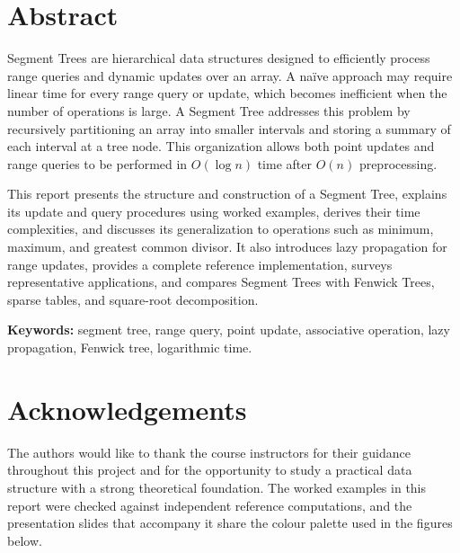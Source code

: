 \documentclass[
  11pt,
  a4paper,
  twoside=false,
  numbers=noenddot,
  headings=big,
  parskip=half,
  toc=bibliography,
  toc=listof,
  bibliography=totoc
]{scrreprt}
\newcounter{example}[chapter]
\begin{document}
\chapter*{Abstract}

Segment Trees are hierarchical data structures designed to efficiently process range queries and dynamic updates over an array. A na\"ive approach may require linear time for every range query or update, which becomes inefficient when the number of operations is large. A Segment Tree addresses this problem by recursively partitioning an array into smaller intervals and storing a summary of each interval at a tree node. This organization allows both point updates and range queries to be performed in $O(\log n)$ time after $O(n)$ preprocessing.

This report presents the structure and construction of a Segment Tree, explains its update and query procedures using worked examples, derives their time complexities, and discusses its generalization to operations such as minimum, maximum, and greatest common divisor. It also introduces lazy propagation for range updates, provides a complete reference implementation, surveys representative applications, and compares Segment Trees with Fenwick Trees, sparse tables, and square-root decomposition.

\bigskip
\noindent\textbf{\sffamily Keywords:} segment tree, range query, point update, associative operation, lazy propagation, Fenwick tree, logarithmic time.

\clearpage
\chapter*{Acknowledgements}

The authors would like to thank the course instructors for their guidance throughout this project and for the opportunity to study a practical data structure with a strong theoretical foundation. The worked examples in this report were checked against independent reference computations, and the presentation slides that accompany it share the colour palette used in the figures below.

\clearpage
\tableofcontents
\clearpage
\listoffigures
\clearpage
\listoftables
\clearpage
\end{document}
